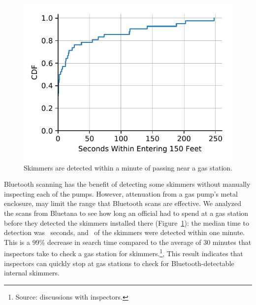 \begin{figure}
\centering
\includegraphics[width=\linewidth]{plots/cdf_skim_discover_time.pdf}
\caption{
\label{fig:skim_discover_time}
 Skimmers are detected within a minute of passing near a gas station.
}
\end{figure}

Bluetooth scanning has the benefit of detecting some skimmers without manually
inspecting each of the pumps.
%
However, attenuation from a gas pump's metal enclosure, may limit the range
that Bluetooth scans are effective.
%
We analyzed the scans from Bluetana to see how long an official had to spend at
a gas station before they detected the skimmers installed there (Figure~\ref{fig:skim_discover_time}):
%
%
the median time to detection was \skimmerdetectiontimemedian~seconds, and
\skimmeroneminutepercent~of the skimmers were detected within one minute.
%
This is a 99\% decrease in search time compared to the average of 30 minutes
that inspectors take to check a gas station for skimmers.\footnote{Source:
discussions with inspectors.},
%
%
This result indicates that inspectors can quickly stop at gas stations
to check for Bluetooth-detectable internal skimmers.

%
%


